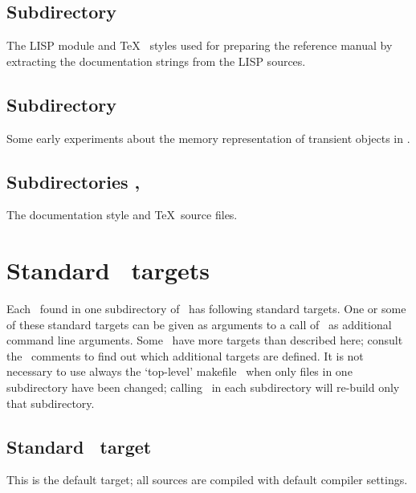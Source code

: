 \subsection*{Subdirectory \protect{}}

The LISP module and %
\TeX\ %
styles used for preparing the reference
manual \cite{bib:PLOB-manual} by extracting the documentation strings from
the LISP sources.

\subsection*{Subdirectory
  \protect{}}

Some early experiments about the memory representation of transient
objects in \lw.

\subsection*{Subdirectories \protect{},
 \protect{}}

The documentation style and \TeX\ source files.

\section[Make targets]%
{Standard \protect{}\ targets}

Each \ found in one subdirectory of
\ has following standard targets. One or some
of these standard targets can be given as arguments to a call of
\ as additional command line arguments.  Some
\ have more targets than described here; consult the
\ comments to find out which additional targets are
defined.  It is not necessary to use always the `top-level' makefile
\ when only files in one
subdirectory have been changed; calling \ in each
subdirectory will re-build only that subdirectory.

\subsection*{Standard \protect{}\ target \protect{}}

This is the default target; all sources are compiled with default
compiler settings.

